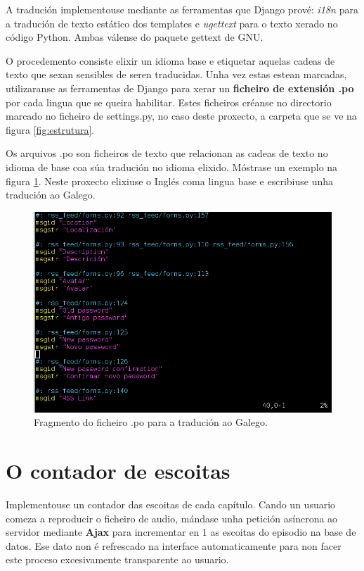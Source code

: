 A tradución implementouse mediante as ferramentas que Django prové: \textit{i18n} para a tradución de texto estático dos templates e \textit{ugettext} para o texto xerado no código Python. Ambas válense do paquete gettext de GNU. 

O procedemento consiste elixir un idioma base e etiquetar aquelas cadeas de texto que sexan sensibles de seren traducidas. Unha vez estas estean marcadas, utilizaranse as ferramentas de Django para xerar un \textbf{ficheiro de extensión .po} por cada lingua que se queira habilitar. Estes ficheiros créanse no directorio marcado no ficheiro de settings.py, no caso deste proxecto, a carpeta  que se ve na figura \ref{fig:estrutura}.

Os arquivos .po son ficheiros de texto que relacionan as cadeas de texto no idioma de base coa súa tradución no idioma elixido. Móstrase un exemplo na figura \ref{fig:traducion}. Neste proxecto elixiuse o Inglés coma lingua base e escribiuse unha tradución ao Galego.

\begin{figure}[h]
	\centering
	\includegraphics[scale=0.5,keepaspectratio=true]{./images/traducion.png}
	\caption{Fragmento do ficheiro .po para a tradución ao Galego.}
	\label{fig:traducion}
\end{figure} 


\section{O contador de escoitas}

Implementouse un contador das escoitas de cada capítulo. Cando un usuario comeza a reproducir o ficheiro de audio, mándase unha petición asíncrona ao servidor mediante \textbf{Ajax} para incrementar en 1 as escoitas do episodio na base de datos. Ese dato non é refrescado na interface automaticamente para non facer este proceso excesivamente transparente ao usuario.

